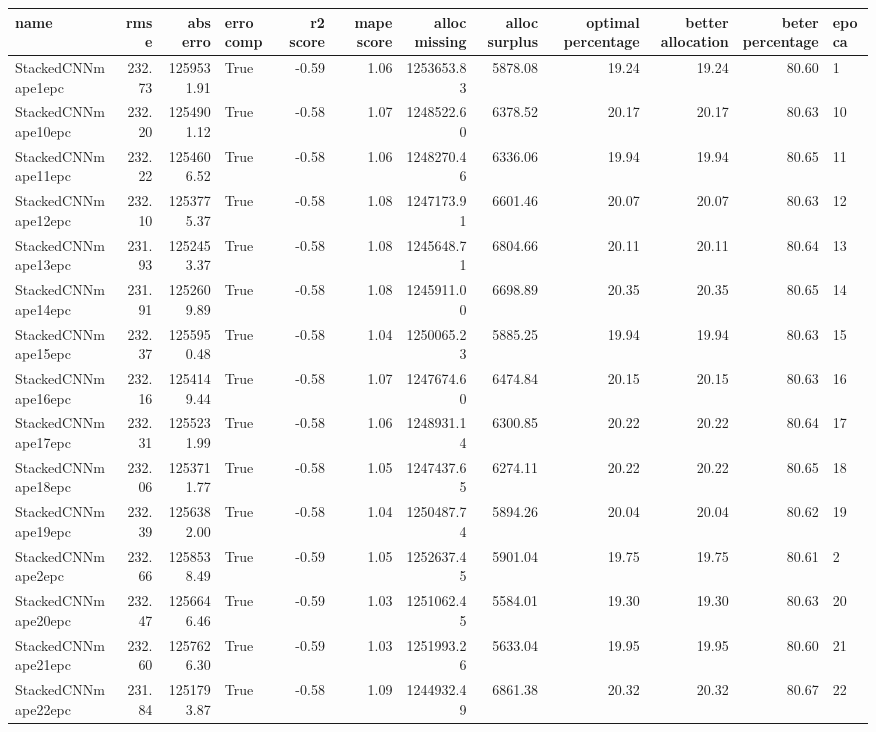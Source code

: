 \begin{tabular}{lrrlrrrrrrrl}
\toprule
name & rmse & abs erro & erro comp & r2 score & mape score & alloc missing & alloc surplus & optimal percentage & better allocation & beter percentage & epoca \\
\midrule
StackedCNNmape1epc & 232.73 & 1259531.91 & True & -0.59 & 1.06 & 1253653.83 & 5878.08 & 19.24 & 19.24 & 80.60 & 1 \\
StackedCNNmape10epc & 232.20 & 1254901.12 & True & -0.58 & 1.07 & 1248522.60 & 6378.52 & 20.17 & 20.17 & 80.63 & 10 \\
StackedCNNmape11epc & 232.22 & 1254606.52 & True & -0.58 & 1.06 & 1248270.46 & 6336.06 & 19.94 & 19.94 & 80.65 & 11 \\
StackedCNNmape12epc & 232.10 & 1253775.37 & True & -0.58 & 1.08 & 1247173.91 & 6601.46 & 20.07 & 20.07 & 80.63 & 12 \\
StackedCNNmape13epc & 231.93 & 1252453.37 & True & -0.58 & 1.08 & 1245648.71 & 6804.66 & 20.11 & 20.11 & 80.64 & 13 \\
StackedCNNmape14epc & 231.91 & 1252609.89 & True & -0.58 & 1.08 & 1245911.00 & 6698.89 & 20.35 & 20.35 & 80.65 & 14 \\
StackedCNNmape15epc & 232.37 & 1255950.48 & True & -0.58 & 1.04 & 1250065.23 & 5885.25 & 19.94 & 19.94 & 80.63 & 15 \\
StackedCNNmape16epc & 232.16 & 1254149.44 & True & -0.58 & 1.07 & 1247674.60 & 6474.84 & 20.15 & 20.15 & 80.63 & 16 \\
StackedCNNmape17epc & 232.31 & 1255231.99 & True & -0.58 & 1.06 & 1248931.14 & 6300.85 & 20.22 & 20.22 & 80.64 & 17 \\
StackedCNNmape18epc & 232.06 & 1253711.77 & True & -0.58 & 1.05 & 1247437.65 & 6274.11 & 20.22 & 20.22 & 80.65 & 18 \\
StackedCNNmape19epc & 232.39 & 1256382.00 & True & -0.58 & 1.04 & 1250487.74 & 5894.26 & 20.04 & 20.04 & 80.62 & 19 \\
StackedCNNmape2epc & 232.66 & 1258538.49 & True & -0.59 & 1.05 & 1252637.45 & 5901.04 & 19.75 & 19.75 & 80.61 & 2 \\
StackedCNNmape20epc & 232.47 & 1256646.46 & True & -0.59 & 1.03 & 1251062.45 & 5584.01 & 19.30 & 19.30 & 80.63 & 20 \\
StackedCNNmape21epc & 232.60 & 1257626.30 & True & -0.59 & 1.03 & 1251993.26 & 5633.04 & 19.95 & 19.95 & 80.60 & 21 \\
StackedCNNmape22epc & 231.84 & 1251793.87 & True & -0.58 & 1.09 & 1244932.49 & 6861.38 & 20.32 & 20.32 & 80.67 & 22 \\

\end{tabular}
